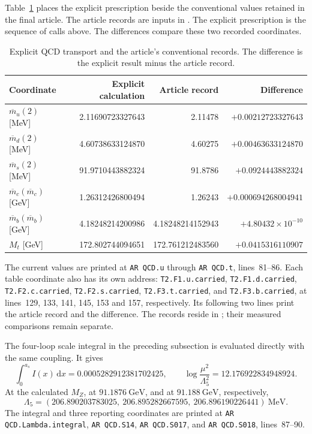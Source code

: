 \documentclass[aps,prx,onecolumn,10pt,notitlepage,nofootinbib,longbibliography]{revtex4-2}
\numberwithin{equation}{section}
\numberwithin{table}{section}
\begin{document}
Table~\ref{tab:qcd-repository-records} places the explicit prescription beside
the conventional values retained in the final article. The article records are inputs in . The explicit prescription is the sequence of calls above. The differences compare these two recorded coordinates.
\begin{table}[htbp]\centering\small
\caption{Explicit QCD transport and the article's conventional records.
The difference is the explicit result minus the article record.}\label{tab:qcd-repository-records}
\begin{tabular}{lrrr}
\toprule
Coordinate&Explicit calculation&Article record&Difference\\
\midrule
$\overline m_u(2)$ [MeV]&2.11690723327643&2.11478&$+0.00212723327643$\\
$\overline m_d(2)$ [MeV]&4.60738633124870&4.60275&$+0.00463633124870$\\
$\overline m_s(2)$ [MeV]&91.9710443882324&91.8786&$+0.0924443882324$\\
$\overline m_c(\overline m_c)$ [GeV]&1.26312426800494&1.26243&$+0.000694268004941$\\
$\overline m_b(\overline m_b)$ [GeV]&4.18248214200986&4.18248214152943&$+4.80432\times10^{-10}$\\
$M_t$ [GeV]&172.802744094651&172.761212483560&$+0.0415316110907$\\
\bottomrule
\end{tabular}
\end{table}
The current values are printed at \texttt{AR QCD.u} through
\texttt{AR QCD.t}, lines~81--86. Each table coordinate also has its own address:
\texttt{T2.F1.u.carried}, \texttt{T2.F1.d.carried},
\texttt{T2.F2.c.carried}, \texttt{T2.F2.s.carried},
\texttt{T2.F3.t.carried}, and \texttt{T2.F3.b.carried}, at
lines~129, 133, 141, 145, 153 and 157, respectively. Its following two lines
print the article record and the difference. The records reside in
; their measured comparisons remain
separate.

The four-loop scale integral in the preceding subsection is evaluated
directly with the same coupling. It gives
\begin{equation}
 \int_0^{a_s}I(x)\,\mathrm dx=0.0005282912381702425,
 \qquad \log\frac{\mu^2}{\Lambda_5^2}=12.176922834948924.
\end{equation}
At the calculated $M_Z$, at $91.1876\ \mathrm{GeV}$, and at
$91.188\ \mathrm{GeV}$, respectively,
\begin{equation}
 \Lambda_5=(206.890203783025,\ 206.895282667595,\ 206.896190226441)
 \ \mathrm{MeV}.
\end{equation}
The integral and three reporting coordinates are printed at
\texttt{AR QCD.Lambda.integral}, \texttt{AR QCD.S14},
\texttt{AR QCD.S017}, and \texttt{AR QCD.S018}, lines~87--90.
\end{document}
